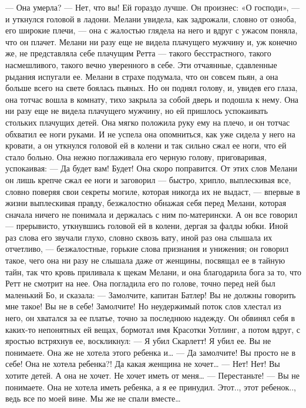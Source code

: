 — Она умерла?
— Нет, что вы! Ей гораздо лучше.
Он произнес: «О господи», — и уткнулся головой в ладони. Мелани увидела, как задрожали, словно от озноба, его широкие плечи, — она с жалостью глядела на него и вдруг с ужасом поняла, что он плачет. Мелани ни разу еще не видела плачущего мужчину и, уж конечно же, не представляла себе плачущим Ретта — такого бесстрастного, такого насмешливого, такого вечно уверенного в себе.
Эти отчаянные, сдавленные рыдания испугали ее. Мелани в страхе подумала, что он совсем пьян, а она больше всего на свете боялась пьяных. Но он поднял голову, и, увидев его глаза, она тотчас вошла в комнату, тихо закрыла за собой дверь и подошла к нему. Она ни разу еще не видела плачущего мужчину, но ей пришлось успокаивать стольких плачущих детей. Она мягко положила руку ему на плечо, и он тотчас обхватил ее ноги руками. И не успела она опомниться, как уже сидела у него на кровати, а он уткнулся головой ей в колени и так сильно сжал ее ноги, что ей стало больно.
Она нежно поглаживала его черную голову, приговаривая, успокаивая:
— Да будет вам! Будет! Она скоро поправится.
От этих слов Мелани он лишь крепче сжал ее ноги и заговорил — быстро, хрипло, выплескивая все, словно поверяя свои секреты могиле, которая никогда их не выдаст, — впервые в жизни выплескивая правду, безжалостно обнажая себя перед Мелани, которая сначала ничего не понимала и держалась с ним по-матерински. А он все говорил — прерывисто, уткнувшись головой ей в колени, дергая за фалды юбки. Иной раз слова его звучали глухо, словно сквозь вату, иной раз она слышала их отчетливо, — безжалостные, горькие слова признания и унижения; он говорил такое, чего она ни разу не слышала даже от женщины, посвящал ее в тайную тайн, так что кровь приливала к щекам Мелани, и она благодарила бога за то, что Ретт не смотрит на нее.
Она погладила его по голове, точно перед ней был маленький Бо, и сказала:
— Замолчите, капитан Батлер! Вы не должны говорить мне такое! Вы не в себе! Замолчите!
Но неудержимый поток слов хлестал из него, он хватался за ее платье, точно за последнюю надежду.
Он обвинял себя в каких-то непонятных ей вещах, бормотал имя Красотки Уотлинг, а потом вдруг, с яростью встряхнув ее, воскликнул:
— Я убил Скарлетт! Я убил ее. Вы не понимаете. Она же не хотела этого ребенка и…
— Да замолчите! Вы просто не в себе! Она не хотела ребенка?! Да какая женщина не хочет…
— Нет! Нет! Вы хотите детей. А она не хочет. Не хочет иметь от меня…
— Перестаньте!
— Вы не понимаете. Она не хотела иметь ребенка, а я ее принудил. Этот.., этот ребенок.., ведь все по моей вине. Мы же не спали вместе…
